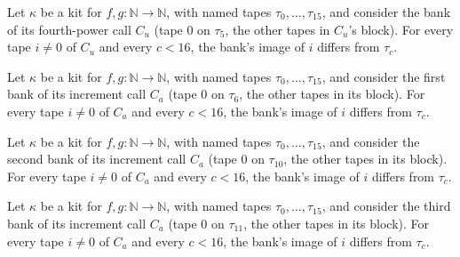 \begin{theorem}
\label{Turing.NTimeDiag.QyKit.bPu_ne}
\leanok
{}
Let $\kappa$ be a kit for $f, g : \mathbb{N} \to \mathbb{N}$, with named tapes $\tau_0, \dots,
\tau_{15}$, and consider the bank of its fourth-power call $C_u$ (tape $0$ on $\tau_5$, the other
tapes in $C_u$'s block). For every tape $i \ne 0$ of $C_u$ and every $c < 16$, the bank's image of
$i$ differs from $\tau_c$.
\end{theorem}

\begin{theorem}
\label{Turing.NTimeDiag.QyKit.bAb0_ne}
\leanok
{}
Let $\kappa$ be a kit for $f, g : \mathbb{N} \to \mathbb{N}$, with named tapes $\tau_0, \dots,
\tau_{15}$, and consider the first bank of its increment call $C_a$ (tape $0$ on $\tau_6$, the
other tapes in its block). For every tape $i \ne 0$ of $C_a$ and every $c < 16$, the bank's image of
$i$ differs from $\tau_c$.
\end{theorem}

\begin{theorem}
\label{Turing.NTimeDiag.QyKit.bAbJ_ne}
\leanok
{}
Let $\kappa$ be a kit for $f, g : \mathbb{N} \to \mathbb{N}$, with named tapes $\tau_0, \dots,
\tau_{15}$, and consider the second bank of its increment call $C_a$ (tape $0$ on $\tau_{10}$, the
other tapes in its block). For every tape $i \ne 0$ of $C_a$ and every $c < 16$, the bank's image of
$i$ differs from $\tau_c$.
\end{theorem}

\begin{theorem}
\label{Turing.NTimeDiag.QyKit.bAbK_ne}
\leanok
{}
Let $\kappa$ be a kit for $f, g : \mathbb{N} \to \mathbb{N}$, with named tapes $\tau_0, \dots,
\tau_{15}$, and consider the third bank of its increment call $C_a$ (tape $0$ on $\tau_{11}$, the
other tapes in its block). For every tape $i \ne 0$ of $C_a$ and every $c < 16$, the bank's image of
$i$ differs from $\tau_c$.
\end{theorem}

